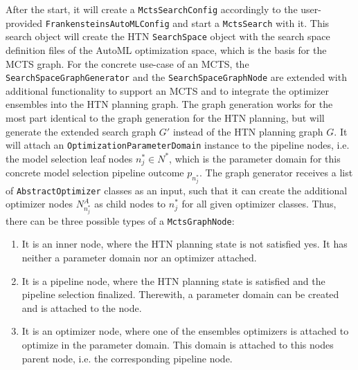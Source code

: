 After the start, it will create a \texttt{MctsSearchConfig} accordingly to the user-provided \texttt{FrankensteinsAutoMLConfig} and start a \texttt{MctsSearch} with it.
This search object will create the HTN \texttt{SearchSpace} object with the search space definition files of the AutoML optimization space, which is the basis for the MCTS graph.\newline
For the concrete use-case of an MCTS, the \texttt{SearchSpaceGraphGenerator} and the \texttt{SearchSpaceGraphNode} are extended with additional functionality to support an MCTS and to integrate the optimizer ensembles into the HTN planning graph.
The graph generation works for the most part identical to the graph generation for the HTN planning, but will generate the extended search graph $G'$ instead of the HTN planning graph $G$.
It will attach an \texttt{OptimizationParameterDomain} instance to the pipeline nodes, i.e. the model selection leaf nodes $n^*_j \in N^*$, which is the parameter domain for this concrete model selection pipeline outcome $p_{n^*_j}$.
The graph generator receives a list of \texttt{AbstractOptimizer} classes as an input, such that it can create the additional optimizer nodes $N^A_{n^*_j}$ as child nodes to $n^*_j$ for all given optimizer classes.\newline
Thus, there can be three possible types of a \texttt{MctsGraphNode}:
\begin{enumerate}
    \item It is an inner node, where the HTN planning state is not satisfied yes. It has neither a parameter domain nor an optimizer attached.
    \item It is a pipeline node, where the HTN planning state is satisfied and the pipeline selection finalized. Therewith, a parameter domain can be created and is attached to the node.
    \item It is an optimizer node, where one of the ensembles optimizers is attached to optimize in the parameter domain. This domain is attached to this nodes parent node, i.e. the corresponding pipeline node.
\end{enumerate}

